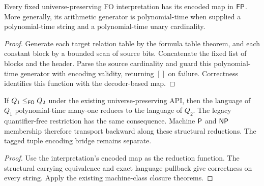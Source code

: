 \begin{theorem}
  \label{thm:desc-encoded-interpretation-polytime}
  \leanok
  Every fixed universe-preserving FO interpretation has its encoded map in
  $\mathsf{FP}$. More generally, its arithmetic generator is polynomial-time when
  supplied a polynomial-time string and a polynomial-time unary cardinality.
\end{theorem}
\begin{proof}
  \leanok
  Generate each target relation table by the formula table theorem, and each
  constant block by a bounded scan of source bits. Concatenate the fixed list
  of blocks and the header. Parse the source cardinality and guard this
  polynomial-time generator with encoding validity, returning $[]$ on failure.
  Correctness identifies this function with the decoder-based map.
\end{proof}

\begin{theorem}
  \label{thm:desc-string-reduction}
  \leanok
  If $Q_1 \le_{\mathsf{FO}} Q_2$ under the existing universe-preserving API, then
  the language of $Q_1$ polynomial-time many-one reduces to the language of $Q_2$.
  The legacy quantifier-free restriction has the same consequence. Machine
  $\mathsf{P}$ and $\mathsf{NP}$ membership therefore transport backward along these
  structural reductions. The tagged tuple encoding bridge remains separate.
\end{theorem}
\begin{proof}
  \leanok
  Use the interpretation's encoded map as the reduction function. The structural
  carrying equivalence and exact language pullback give correctness on every
  string. Apply the existing machine-class closure theorems.
\end{proof}

